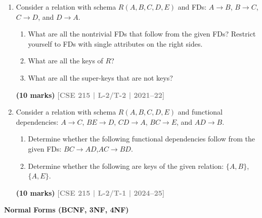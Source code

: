 \documentclass[12pt,a3paper]{article}
\newcommand{\yr}[1]{\hfill\textcolor{gray}{\small\textbf{[#1]}}}
\newcommand{\mk}[1]{\textcolor{orange!70!black}{\small\textbf{(#1 marks)}}}
\newcommand{\subtopic}[2]{%
  \vspace{10pt}
  \noindent\begin{tcolorbox}[colback=#1!8,colframe=#1,boxrule=0.6pt,arc=4pt,
    left=6pt,right=6pt,top=4pt,bottom=4pt]
    \small\bfseries\textcolor{#1}{#2}
  \end{tcolorbox}
  \vspace{2pt}
}
\begin{document}
\begin{enumerate}
\item Consider a relation with schema $R(A, B, C, D, E)$ and FDs: $A \to B$, $B \to C$, $C \to D$, and $D \to A$.
\begin{enumerate}
  \item What are all the nontrivial FDs that follow from the given FDs? Restrict yourself to FDs with single attributes on the right sides.
  \item What are all the keys of $R$?
  \item What are all the super-keys that are not keys?
\end{enumerate}
\mk{10} \yr{CSE 215 | L-2/T-2 | 2021--22}

\item Consider a relation with schema $R(A,B,C,D,E)$ and functional dependencies: $A \to C$, $BE \to D$, $CD \to A$, $BC \to E$, and $AD \to B$.
\begin{enumerate}
  \item Determine whether the following functional dependencies follow from the given FDs: $BC \to AD$,\quad $AC \to BD$.
  \item Determine whether the following are keys of the given relation: $\{A,B\}$,\quad $\{A,E\}$.
\end{enumerate}
\mk{10} \yr{CSE 215 | L-2/T-1 | 2024--25}

\end{enumerate}

\subtopic{cC}{Normal Forms (BCNF, 3NF, 4NF)}
\label{sub:s4-nf}
\end{document}
